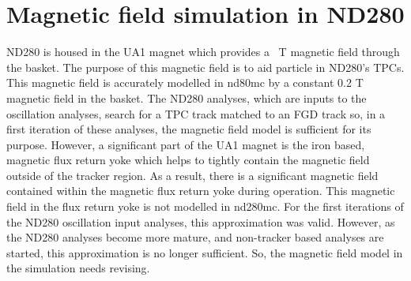 


\chapter{Magnetic field simulation in ND280}
\label{chap:MagneticFieldSimulation}
ND280 is housed in the  UA1 magnet which provides a ~T magnetic field through the basket.  The purpose of this magnetic field is to aid particle   in ND280's TPCs.  This magnetic field is accurately modelled in nd80mc by a constant 0.2 T magnetic field in the basket.  The ND280 analyses, which are inputs to the oscillation analyses, search for a TPC track matched to an FGD track so, in a first iteration of these analyses, the magnetic field model is sufficient for its purpose.
\newline
\newline
However, a significant part of the UA1 magnet is the iron based, magnetic flux return yoke which helps to tightly contain the magnetic field outside of the tracker region.  As a result, there is a significant magnetic field contained within the magnetic flux return yoke during operation.  This magnetic field in the flux return yoke is not modelled in nd280mc.  For the first iterations of the ND280 oscillation input analyses, this approximation was valid.  However, as the ND280 analyses become more mature, and non-tracker based analyses are started, this approximation is no longer sufficient.  So, the magnetic field model in the simulation needs revising.


